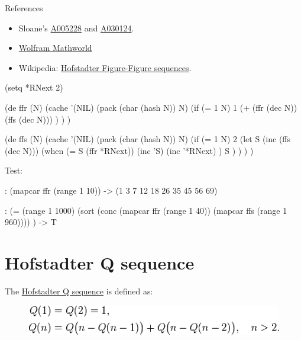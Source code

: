 \begin{itemize}
\begin{description}
\item[References]
\end{description}

\begin{itemize}
\item
  Sloane's \href{http://oeis.org/A005228}{A005228} and
  \href{http://oeis.org/A030124}{A030124}.
\item
  \href{http://mathworld.wolfram.com/HofstadterFigure-FigureSequence.html}{Wolfram
  Mathworld}
\item
  Wikipedia:
  \href{http://en.wikipedia.org/wiki/Hofstadter\_sequence\#Hofstadter\_Figure-Figure\_sequences}{Hofstadter
  Figure-Figure sequences}.
\end{itemize}


\begin{wideverbatim}

(setq *RNext 2)

(de ffr (N)
   (cache '(NIL) (pack (char (hash N)) N)
      (if (= 1 N)
         1
         (+ (ffr (dec N)) (ffs (dec N))) ) ) )

(de ffs (N)
   (cache '(NIL) (pack (char (hash N)) N)
      (if (= 1 N)
         2
         (let S (inc (ffs (dec N)))
            (when (= S (ffr *RNext))
               (inc 'S)
               (inc '*RNext) )
            S ) ) ) )

Test:

: (mapcar ffr (range 1 10))
-> (1 3 7 12 18 26 35 45 56 69)

: (=
   (range 1 1000)
   (sort (conc (mapcar ffr (range 1 40)) (mapcar ffs (range 1 960)))) )
-> T

\end{wideverbatim}

\pagebreak{}
\section*{Hofstadter Q sequence}

The
\href{http://en.wikipedia.org/wiki/Hofstadter\_sequence\#Hofstadter\_Q\_sequence}{Hofstadter
Q sequence} is defined as:

\begin{figure}[H]
\centering
\includegraphics[scale=.6]{graphics/a049527fb76c4d324e8790190e84ba28.png}
\end{figure}


\end{itemize}
